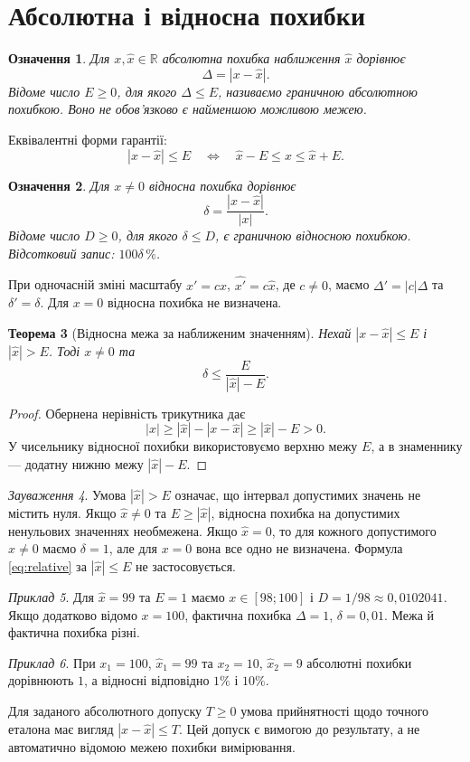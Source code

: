 \documentclass[11pt,a4paper]{article}
\newtheorem{definition}{Означення}[section]
\newtheorem{theorem}[definition]{Теорема}
\theoremstyle{remark}
\newtheorem{remark}[definition]{Зауваження}
\newtheorem{example}[definition]{Приклад}
\newcommand{\R}{\mathbb R}
\newcommand{\xh}{\widehat x}
\begin{document}
\section{Абсолютна і відносна похибки}
\begin{definition}
Для $x,\xh\in\R$ абсолютна похибка наближення $\xh$ дорівнює
\[
 \Delta=|x-\xh|.
\]
Відоме число $E\ge0$, для якого $\Delta\le E$, називаємо граничною абсолютною похибкою. Воно не обов'язково є найменшою можливою межею.
\end{definition}
Еквівалентні форми гарантії:
\begin{equation}
 |x-\xh|\le E\quad\Longleftrightarrow\quad \xh-E\le x\le\xh+E.
\end{equation}
\begin{definition}
Для $x\ne0$ відносна похибка дорівнює
\[
 \delta=\frac{|x-\xh|}{|x|}.
\]
Відоме число $D\ge0$, для якого $\delta\le D$, є граничною відносною похибкою. Відсотковий запис: $100\delta\,\%$.
\end{definition}
При одночасній зміні масштабу $x'=cx$, $\widehat{x'}=c\xh$, де $c\ne0$, маємо $\Delta'=|c|\Delta$ та $\delta'=\delta$. Для $x=0$ відносна похибка не визначена.
\begin{theorem}[Відносна межа за наближеним значенням]
Нехай $|x-\xh|\le E$ і $|\xh|>E$. Тоді $x\ne0$ та
\begin{equation}\label{eq:relative}
 \delta\le\frac{E}{|\xh|-E}.
\end{equation}
\end{theorem}
\begin{proof}
Обернена нерівність трикутника дає
\[
 |x|\ge|\xh|-|x-\xh|\ge|\xh|-E>0.
\]
У чисельнику відносної похибки використовуємо верхню межу $E$, а в знаменнику --- додатну нижню межу $|\xh|-E$.
\end{proof}
\begin{remark}
Умова $|\xh|>E$ означає, що інтервал допустимих значень не містить нуля. Якщо $\xh\ne0$ та $E\ge|\xh|$, відносна похибка на допустимих ненульових значеннях необмежена. Якщо $\xh=0$, то для кожного допустимого $x\ne0$ маємо $\delta=1$, але для $x=0$ вона все одно не визначена. Формула \eqref{eq:relative} за $|\xh|\le E$ не застосовується.
\end{remark}
\begin{example}
Для $\xh=99$ та $E=1$ маємо $x\in[98;100]$ і $D=1/98\approx0{,}0102041$. Якщо додатково відомо $x=100$, фактична похибка $\Delta=1$, $\delta=0{,}01$. Межа й фактична похибка різні.
\end{example}
\begin{example}
При $x_1=100$, $\widehat x_1=99$ та $x_2=10$, $\widehat x_2=9$ абсолютні похибки дорівнюють $1$, а відносні відповідно $1\%$ і $10\%$.
\end{example}
Для заданого абсолютного допуску $T\ge0$ умова прийнятності щодо точного еталона має вигляд $|x-\xh|\le T$. Цей допуск є вимогою до результату, а не автоматично відомою межею похибки вимірювання.
\end{document}
